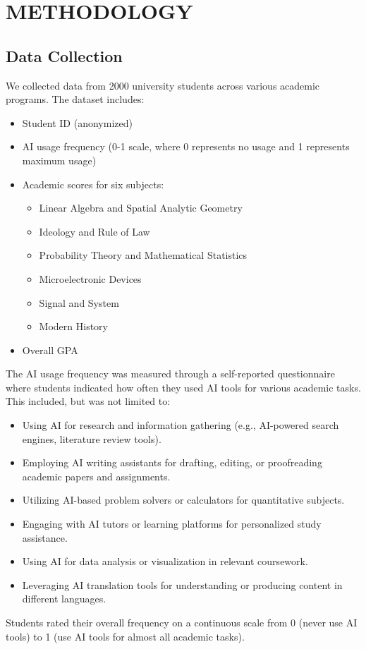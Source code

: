 \documentclass[manuscript,screen,review]{acmart}
\begin{document}
\section{METHODOLOGY}

\subsection{Data Collection}

We collected data from 2000 university students across various academic programs. The dataset includes:
\begin{itemize}
\item Student ID (anonymized)
\item AI usage frequency (0-1 scale, where 0 represents no usage and 1 represents maximum usage)
\item Academic scores for six subjects:
    \begin{itemize}
  \item Linear Algebra and Spatial Analytic Geometry
  \item Ideology and Rule of Law
  \item Probability Theory and Mathematical Statistics
  \item Microelectronic Devices
  \item Signal and System
  \item Modern History
    \end{itemize}
\item Overall GPA
\end{itemize}

The AI usage frequency was measured through a self-reported questionnaire where students indicated how often they used AI tools for various academic tasks. This included, but was not limited to:
\begin{itemize}
  \item Using AI for research and information gathering (e.g., AI-powered search engines, literature review tools).
  \item Employing AI writing assistants for drafting, editing, or proofreading academic papers and assignments.
  \item Utilizing AI-based problem solvers or calculators for quantitative subjects.
  \item Engaging with AI tutors or learning platforms for personalized study assistance.
  \item Using AI for data analysis or visualization in relevant coursework.
  \item Leveraging AI translation tools for understanding or producing content in different languages.
\end{itemize}
Students rated their overall frequency on a continuous scale from 0 (never use AI tools) to 1 (use AI tools for almost all academic tasks).
\end{document}
